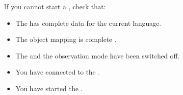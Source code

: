 % 
%
%
If you cannot start a \gdsuite{}, check that:
\begin{itemize}
\item The \gdsuite{} has complete data for the current language.  
\item The object mapping is complete .
\item The \gdomm{} and the observation mode have been switched off. 
\item You have connected to the \gdserver{} . 
\item You have started the \gdaut{} . 
 \end{itemize}
 




